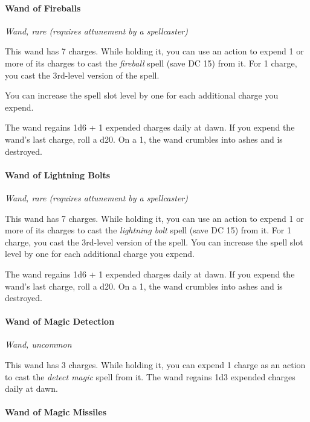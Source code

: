 \documentclass[
]{article}
\begin{document}
\hypertarget{wand-of-fireballs}{%
\paragraph{Wand of Fireballs}\label{wand-of-fireballs}}

\emph{Wand, rare (requires attunement by a spellcaster)}

This wand has 7 charges. While holding it, you can use an action to
expend 1 or more of its charges to cast the \emph{fireball} spell (save
DC 15) from it. For 1 charge, you cast the 3rd-level version of the
spell.

You can increase the spell slot level by one for each additional charge
you expend.

The wand regains 1d6 + 1 expended charges daily at dawn. If you expend
the wand's last charge, roll a d20. On a 1, the wand crumbles into ashes
and is destroyed.

\hypertarget{wand-of-lightning-bolts}{%
\paragraph{Wand of Lightning Bolts}\label{wand-of-lightning-bolts}}

\emph{Wand, rare (requires attunement by a spellcaster)}

This wand has 7 charges. While holding it, you can use an action to
expend 1 or more of its charges to cast the \emph{lightning bolt} spell
(save DC 15) from it. For 1 charge, you cast the 3rd-level version of
the spell. You can increase the spell slot level by one for each
additional charge you expend.

The wand regains 1d6 + 1 expended charges daily at dawn. If you expend
the wand's last charge, roll a d20. On a 1, the wand crumbles into ashes
and is destroyed.

\hypertarget{wand-of-magic-detection}{%
\paragraph{Wand of Magic Detection}\label{wand-of-magic-detection}}

\emph{Wand, uncommon}

This wand has 3 charges. While holding it, you can expend 1 charge as an
action to cast the \emph{detect magic} spell from it. The wand regains
1d3 expended charges daily at dawn.

\hypertarget{wand-of-magic-missiles}{%
\paragraph{Wand of Magic Missiles}\label{wand-of-magic-missiles}}
\end{document}
